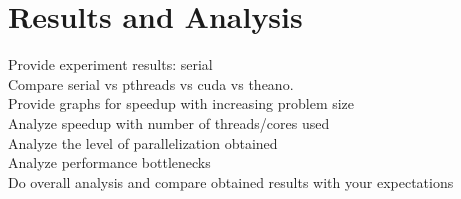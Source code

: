 \section{Results and Analysis}
\label{Results}

Provide experiment results: serial \\
Compare serial vs pthreads vs cuda vs theano. \\
Provide graphs for speedup with increasing problem size \\
Analyze speedup with number of threads/cores used \\
Analyze the level of parallelization obtained \\
Analyze performance bottlenecks \\
Do overall analysis and compare obtained results with your expectations